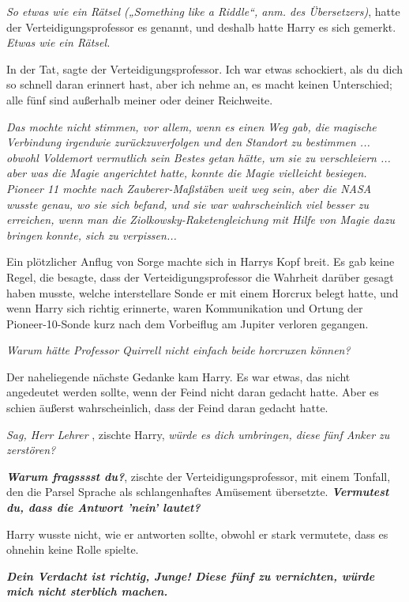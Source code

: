 \emph{So etwas wie ein Rätsel („Something like a Riddle“, anm. des
Übersetzers)}, hatte der Verteidigungsprofessor es genannt, und deshalb hatte
Harry es sich gemerkt.
\emph{Etwas wie ein Rätsel.}

\glqq In der Tat\grqq{}, sagte der Verteidigungsprofessor. \glqq Ich war etwas
schockiert, als du dich so schnell daran erinnert hast, aber ich nehme an, es
macht keinen Unterschied; alle fünf sind außerhalb meiner oder deiner
Reichweite.\grqq{}

\emph{Das mochte nicht stimmen, vor allem, wenn es einen Weg gab, die magische Verbindung irgendwie zurückzuverfolgen und den Standort zu bestimmen ... obwohl Voldemort vermutlich sein Bestes getan hätte, um sie zu verschleiern ... aber was die Magie angerichtet hatte, konnte die Magie vielleicht besiegen. Pioneer 11 mochte nach Zauberer-Maßstäben weit weg sein, aber die NASA wusste genau, wo sie sich befand, und sie war wahrscheinlich viel besser zu erreichen, wenn man die Ziolkowsky-Raketengleichung mit Hilfe von Magie dazu bringen konnte, sich zu verpissen... }

Ein plötzlicher Anflug von Sorge machte sich in Harrys Kopf breit. Es gab keine
Regel, die besagte, dass der Verteidigungsprofessor die Wahrheit darüber gesagt
haben musste, welche interstellare Sonde er mit einem Horcrux belegt hatte, und
wenn Harry sich richtig erinnerte, waren Kommunikation und Ortung der
Pioneer-10-Sonde kurz nach dem Vorbeiflug am Jupiter verloren gegangen.

\emph{Warum hätte Professor Quirrell nicht einfach beide horcruxen können? }

Der naheliegende nächste Gedanke kam Harry. Es war etwas, das nicht angedeutet
werden sollte, wenn der Feind nicht daran gedacht hatte. Aber es schien äußerst
wahrscheinlich, dass der Feind daran gedacht hatte.

\glqq \emph{Sag, Herr Lehrer\grqq{} }, zischte Harry, \glqq \emph{würde es dich
umbringen, diese fünf Anker zu zerstören?}\grqq{}

\glqq \textbf{\emph{Warum fragsssst du?}}\grqq{}, zischte der
Verteidigungsprofessor, mit einem Tonfall, den die Parsel Sprache als
schlangenhaftes Amüsement übersetzte. \glqq \textbf{\emph{Vermutest du, dass die
Antwort 'nein' lautet?}}\grqq{}

Harry wusste nicht, wie er antworten sollte, obwohl er stark vermutete, dass es
ohnehin keine Rolle spielte.

\glqq \textbf{\emph{Dein Verdacht ist richtig, Junge! Diese fünf zu vernichten,
würde mich nicht sterblich machen.}}\grqq{}

